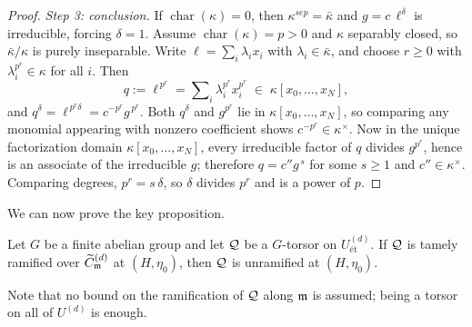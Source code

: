 \begin{proof}
    \emph{Step 3: conclusion.} If $\operatorname{char}(\kappa) = 0$, then
    $\kappa^{sep} = \bar{\kappa}$ and $g = c\,\ell^\delta$ is irreducible, forcing
    $\delta = 1$. Assume $\operatorname{char}(\kappa) = p > 0$ and $\kappa$ separably closed,
    so $\bar{\kappa}/\kappa$ is purely inseparable. Write $\ell = \sum_i \lambda_i x_i$ with
    $\lambda_i \in \bar{\kappa}$, and choose $r \geq 0$ with $\lambda_i^{p^r} \in \kappa$ for
    all $i$. Then
    \[ q := \ell^{\,p^r} = \sum\nolimits_i \lambda_i^{p^r} x_i^{p^r}
       \; \in \; \kappa[x_0, \dots, x_N], \]
    and $q^{\delta} = \ell^{\,p^r \delta} = c^{-p^r} g^{\,p^r}$. Both $q^\delta$ and
    $g^{p^r}$ lie in $\kappa[x_0, \dots, x_N]$, so comparing any monomial appearing with
    nonzero coefficient shows $c^{-p^r} \in \kappa^\times$. Now in the unique factorization
    domain $\kappa[x_0, \dots, x_N]$, every irreducible factor of $q$ divides $g^{p^r}$, hence
    is an associate of the irreducible $g$; therefore $q = c'' g^{\,s}$ for some $s \geq 1$ and
    $c'' \in \kappa^\times$. Comparing degrees, $p^r = s\,\delta$, so $\delta$ divides $p^r$
    and is a power of $p$.
\end{proof}

We can now prove the key proposition.

\begin{prop}\label{prop:tame_at_boundary_implies_unramified_r2}
    Let $G$ be a finite abelian group and let $\mathcal{Q}$ be a $G$-torsor on $U^{(d)}_{\text{\'et}}$.
    If $\mathcal{Q}$ is tamely ramified over $\widetilde{C}_{\mathfrak{m}}^{(d)}$ at $(H, \eta_0)$, then $\mathcal{Q}$ is unramified at
    $(H, \eta_0)$.
\end{prop}

Note that no bound on the ramification of $\mathcal{Q}$ along $\mathfrak{m}$ is assumed;
being a torsor on all of $U^{(d)}$ is enough.

